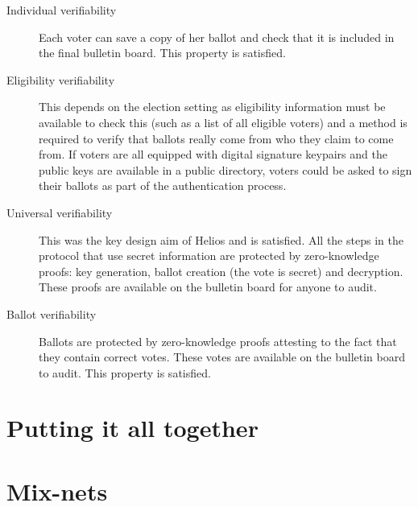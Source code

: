 \documentclass{llncs}
\begin{document}
\begin{description}
\item[Individual verifiability]
Each voter can save a copy of her ballot and check that it is included in the
final bulletin board. This property is satisfied.

\item[Eligibility verifiability]
This depends on the election setting as eligibility information must be
available to check this (such as a list of all eligible voters) and a method is
required to verify that ballots really come from who they claim to come from. If
voters are all equipped with digital signature keypairs and the public keys are
available in a public directory, voters could be asked to sign their ballots as
part of the authentication process.

\item[Universal verifiability]
This was the key design aim of Helios and is satisfied. All the steps in the
protocol that use secret information are protected by zero-knowledge proofs:
key generation, ballot creation (the vote is secret) and decryption. These
proofs are available on the bulletin board for anyone to audit.

\item[Ballot verifiability]
Ballots are protected by zero-knowledge proofs attesting to the fact that they
contain correct votes. These votes are available on the bulletin board to audit.
This property is satisfied\footnotemark.
\end{description}


\section{Putting it all together}

\section{Mix-nets}
\end{document}
